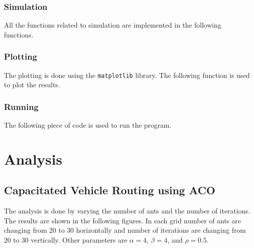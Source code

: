 \documentclass[12pt]{report}
\begin{document}
\subsection{Simulation}
All the functions related to simulation are implemented in the following functions.


\subsection{Plotting}
The plotting is done using the {\tt matplotlib} library. The following function is used to plot the results.


\newpage

\subsection{Running}
The following piece of code is used to run the program.


\chapter{Analysis}
\section{Capacitated Vehicle Routing using ACO}

The analysis is done by varying the number of ants and the number of iterations. The results are shown in the following figures. In each grid number of ants are changing from 20 to 30 horizontally and number of iterations are changing from 20 to 30 vertically. Other parameters are \(\alpha = 4\), \(\beta = 4\), and \(\rho = 0.5\).
\end{document}
